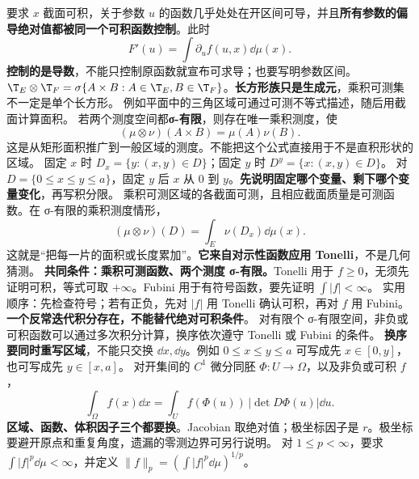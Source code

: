 要求 $x$ 截面可积，关于参数 $u$ 的函数几乎处处在开区间可导，并且\textbf{所有参数的偏导绝对值都被同一个可积函数控制}。此时
\[
F'(u)=\int\partial_u f(u,x)\dd\mu(x).
\]
\textbf{控制的是导数}，不能只控制原函数就宣布可求导；也要写明参数区间。
$\T_E\otimes\T_F=\sigma\{A\times B:A\in\T_E,B\in\T_F\}$。\textbf{长方形族只是生成元}，乘积可测集不一定是单个长方形。
例如平面中的三角区域可通过可测不等式描述，随后用截面计算面积。
若两个测度空间都\textbf{σ-有限}，则存在唯一乘积测度，使
\[
(\mu\otimes\nu)(A\times B)=\mu(A)\nu(B).
\]
这是从矩形面积推广到一般区域的测度。不能把这个公式直接用于不是直积形状的区域。
固定 $x$ 时 $D_x=\{y:(x,y)\in D\}$；固定 $y$ 时 $D^y=\{x:(x,y)\in D\}$。
对 $D=\{0\le x\le y\le a\}$，固定 $y$ 后 $x$ 从 $0$ 到 $y$。\textbf{先说明固定哪个变量、剩下哪个变量变化}，再写积分限。
乘积可测区域的各截面可测，且相应截面质量是可测函数。在 σ-有限的乘积测度情形，
\[
(\mu\otimes\nu)(D)=\int_E\nu(D_x)\dd\mu(x).
\]
这就是“把每一片的面积或长度累加”。\textbf{它来自对示性函数应用 Tonelli}，不是几何猜测。
\textbf{共同条件：乘积可测函数、两个测度 σ-有限。}Tonelli 用于 $f\ge0$，无须先证明可积，等式可取 $+\infty$。Fubini 用于有符号函数，要先证明 $\int|f|<\infty$。
实用顺序：先检查符号；若有正负，先对 $|f|$ 用 Tonelli 确认可积，再对 $f$ 用 Fubini。\textbf{一个反常迭代积分存在，不能替代绝对可积条件}。
对有限个 σ-有限空间，非负或可积函数可以通过多次积分计算，换序依次遵守 Tonelli 或 Fubini 的条件。
\textbf{换序要同时重写区域}，不能只交换 $\dd x,\dd y$。例如 $0\le x\le y\le a$ 可写成先 $x\in[0,y]$，也可写成先 $y\in[x,a]$。
对开集间的 $C^1$ 微分同胚 $\Phi:U\to\Omega$，以及非负或可积 $f$，
\[
\int_\Omega f(x)\dd x=\int_U f(\Phi(u))\,|\det D\Phi(u)|\dd u.
\]
\textbf{区域、函数、体积因子三个都要换}。Jacobian 取绝对值；极坐标因子是 $r$。极坐标要避开原点和重复角度，遗漏的零测边界可另行说明。
对 $1\le p<\infty$，要求 $\int|f|^p\dd\mu<\infty$，并定义 $\|f\|_p=(\int|f|^p\dd\mu)^{1/p}$。
